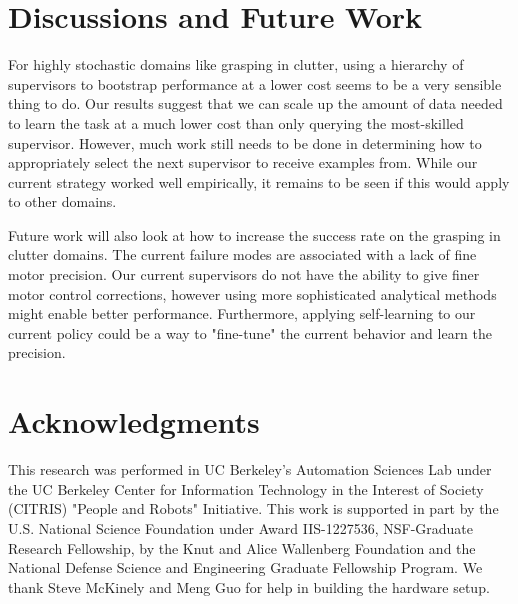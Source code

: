 \documentclass[10pt, conference]{ieeeconf}      %
\begin{document}
\section{Discussions and Future Work}
For highly stochastic domains like grasping in clutter, using a hierarchy of supervisors to bootstrap performance at a lower cost seems to be a very sensible thing to do. Our results suggest that we can scale up the amount of data needed to learn the task at a much lower cost than only querying the most-skilled supervisor. However, much work still needs to be done in determining how to appropriately select the next supervisor to receive examples from. While our current strategy worked well empirically, it remains to be seen if this would apply to other domains. 

Future work will also look at how to increase the success rate on the grasping in clutter domains. The current failure modes are associated with a lack of fine motor precision. Our current supervisors do not  have the ability to give finer motor control corrections, however using more sophisticated analytical methods might enable better performance. Furthermore, applying self-learning  to our current policy could be a way to "fine-tune" the current behavior and learn the precision. 




 \section{Acknowledgments} 
This research was performed in UC Berkeley's Automation Sciences Lab under the UC Berkeley Center for Information Technology in the Interest of Society (CITRIS) "People and Robots" Initiative. This work is supported in part by the U.S. National Science Foundation under Award IIS-1227536, NSF-Graduate Research Fellowship, by the Knut and Alice Wallenberg Foundation and the National Defense Science and Engineering Graduate Fellowship Program. We thank Steve McKinely and Meng Guo for help in building the hardware setup.  

  


\end{document}

